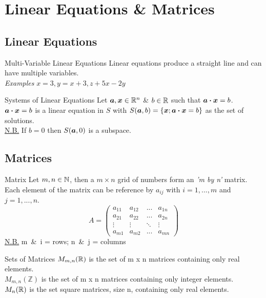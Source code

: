 \documentclass[11pt,a4paper]{article}
\begin{document}
\section{Linear Equations \& Matrices}

\subsection{Linear Equations}

\subtitle{Definition 3.01 - }{Multi-Variable Linear Equations}
Linear equations produce a straight line and can have multiple variables. \\
\textit{Examples} $x = 3, y = x + 3, z + 5x - 2y$ \\

\subtitle{Defintion 3.02 - }{Systems of Linear Equations}
Let $\boldsymbol{a}, \boldsymbol{x} \in \mathbb{R}^n$ \& $b \in \mathbb{R}$ such that $\boldsymbol{a} \boldsymbol{\cdot} \boldsymbol{x} = b$. \\
$\boldsymbol{a} \boldsymbol{\cdot} \boldsymbol{x} = b$ is a linear equation in $S$ with $S(\boldsymbol{a}, b) = \{\boldsymbol{x}; \boldsymbol{a} \boldsymbol{\cdot} \boldsymbol{x} = b\}$ as the set of solutions. \\
\underline{N.B.} If $b = 0$ then $S(\boldsymbol{a}, 0)$ is a subspace.

\subsection{Matrices}

\subtitle{Definition 3.03 - }{Matrix}
Let $m, n \in \mathbb{N}$, then a $m \times n$ grid of numbers form an \textit{'m by n'} matrix.
Each element of the matrix can be reference by $a_{ij}$ with $i = 1, ... , m$ and $j = 1, ... , n$.
$$ A = \begin{pmatrix}
  a_{11} & a_{12} & ... & a_{1n} \\
  a_{21} & a_{22} & ... & a_{2n} \\
  \vdots & \vdots & \ddots & \vdots \\
  a_{m1} & a_{m2} & ... & a_{mn}
\end{pmatrix}
$$
\underline{N.B.} m\ \&\ i = rows; n\ \&\ j = columns \\

\subtitle{Definition 3.04 - }{Sets of Matrices}
$M_{m,n}(\mathbb{R})$ is the set of m x n matrices containing only real elements. \\
$M_{m,n}(\mathbb{Z})$ is the set of m x n matrices containing only integer elements. \\
$M_{n}(\mathbb{R})$ is the set square matrices, size n, containing only real elements. \\
\end{document}
